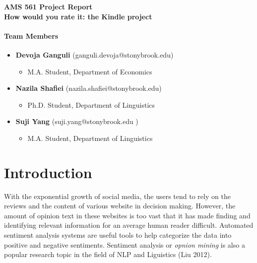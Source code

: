 \documentclass[a4paper,12pt]{article}
\begin{document}
\begin{center}
    {\bfseries AMS 561 Project Report \\ How would you rate it: the Kindle project}
    \end{center}


\paragraph{Team Members} 
\vspace{0.5cm}

\begin{itemize}
\item \textbf{Devoja Ganguli} (ganguli.devoja@stonybrook.edu)
\begin{itemize}
\item M.A. Student, Department of Economics
\end{itemize}
\end{itemize}

\begin{itemize}
\item \textbf{Nazila Shafiei} (nazila.shafiei@stonybrook.edu)
\begin{itemize}
\item Ph.D. Student, Department of Linguistics
\end{itemize}
\end{itemize}

\begin{itemize}
\item \textbf{Suji Yang} (suji.yang@stonybrook.edu )
\begin{itemize}
\item M.A. Student, Department of Linguistics
\end{itemize}
\end{itemize}

\section{Introduction}

With the exponential growth of social media, the users tend to rely on the reviews and the content of various website in decision making. However, the amount of opinion text in these websites is too vast that it has made finding and identifying relevant information for an average human reader difficult. Automated sentiment analysis systems are useful tools to help categorize the data into positive and negative sentiments. Sentiment analysis or \textit{opnion mining} is also a popular research topic in the field of NLP and Liguistics (Liu 2012). 
\end{document}
